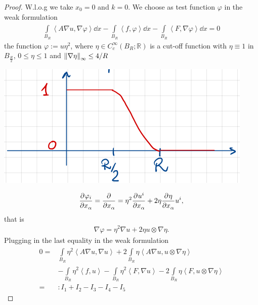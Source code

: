 \begin{proof}
	W.l.o.g we take \(x_{0}=0\) and \(k=0\). We choose as test function \(\varphi \) in the weak formulation
	\begin{gather}
		\int\limits_{B_{R}}^{} \left\langle  A \nabla u, \nabla \varphi \right\rangle \dd{x} - \int\limits_{B_{R}}^{} \left\langle  f,\varphi \right\rangle \dd{x} -\int\limits_{B_{R}}^{} \left\langle  F,\nabla\varphi \right\rangle \dd{x} =0
	\end{gather}
	the function \(\varphi:= u \eta^{2}\), where \(\eta \in C_{c}^{\infty}(B_{R}; \mathbb{R})\) is a cut-off function with \(\eta \equiv 1\) in \(B_{\frac{R}{2}}\), \(0 \leq \eta \leq 1\) and \(\norm{\nabla \eta}_{\infty} \leq \frac{4}{R}\)
	\begin{center}
		\includegraphics[scale=0.45]{pictures/picture01.png}
	\end{center}
	\begin{gather}
		\pdv[]{\varphi_{i}}{x_{\alpha}} = \pdv[]{}{x_{\alpha}} (\eta^{2}u^{2}) = \eta^{2}\pdv[]{u^{i}}{x_{\alpha}}+2 \eta \pdv[]{\eta}{x_{\alpha}} u^{i},
	\end{gather}
	that is
	\begin{gather}
		\nabla \varphi = \eta^{2} \nabla u + 2 \eta u \otimes \nabla \eta.
	\end{gather}
	Plugging in the last equality in the weak formulation
	\begin{align}
		0= & \int\limits_{B_{R}}^{} \eta^{2} \left\langle A \nabla u , \nabla u \right\rangle + 2 \int\limits_{B_{R}}^{} \eta \left\langle A \nabla u , u \otimes \nabla \eta \right\rangle  \\
		   & - \int\limits_{B_{R}}^{} \eta^{2} \left\langle f, u \right\rangle - \int\limits_{B_{R}}^{} \eta^{2} \left\langle F, \nabla u \right\rangle - 2 \int\limits_{B_{R}}^{} \eta \left\langle  F, u \otimes \nabla \eta \right\rangle  \\
		=  & : I_{1} + I_{2} -I_{3} - I_{4} - I_{5}
	\end{align}

\end{proof}
